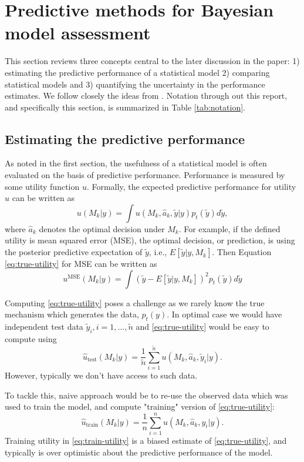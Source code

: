 \documentclass{article}
\begin{document}
\section{Predictive methods for Bayesian model assessment}
This section reviews three concepts central to the later discussion in the paper: 1) estimating the predictive performance of a statistical model 2) comparing statistical models and 3) quantifying the uncertainty in the performance estimates. We follow closely the ideas from \cite{vehtari_survey_2012}. Notation through out this report, and specifically this section, is summarized in Table  \ref{tab:notation}.

\subsection{Estimating the predictive performance}
As noted in the first section, the usefulness of a statistical model is often evaluated on the basis of predictive performance. Performance is measured by some utility function $u$. Formally, the expected predictive performance for utility $u$ can be written as 
\begin{equation}
u(M_k | y) = \int u(M_k, \hat{a}_k, \tilde{y} | y) p_t(\tilde{y}) d\tilde{y}, \label{eq:true-utility}
\end{equation}
where $\hat{a}_k$ denotes the optimal decision under $M_k$. For example, if the defined utility is mean squared error (MSE), the optimal decision, or prediction, is using the posterior predictive expectation of $\tilde{y}$, i.e., $E\left[ \tilde{y} | y, M_k \right]$. Then Equation \eqref{eq:true-utility} for MSE can be written as
$$
u^{\text{MSE}}(M_k | y) = \int \left( \tilde{y} - E\left[ \tilde{y} | y, M_k \right] \right)^2 p_t(\tilde{y}) d\tilde{y}
$$

Computing \eqref{eq:true-utility} poses a challenge as we rarely know the true mechanism which generates the data, $p_t(y)$. In optimal case we would have independent test data $\tilde{y}_i, i=1,...,\tilde{n}$ and \eqref{eq:true-utility} would be easy to compute using
\begin{equation}
    \hat{u}_{\text{test}}(M_k | y) = \frac{1}{\tilde{n}} \sum_{i=1}^{\tilde{n}} u(M_k, \hat{a}_k, \tilde{y}_i | y). \label{eq:test-utility}
\end{equation}
However, typically we don't have access to such data.

To tackle this, naive approach would be to re-use the observed data which was used to train the model, and compute "training" version of \eqref{eq:true-utility}:
\begin{equation}
    \hat{u}_{\text{train}}(M_k | y) = \frac{1}{n} \sum_{i=1}^n u(M_k, \hat{a}_k, y_i | y). \label{eq:train-utility}
\end{equation}
Training utility in \eqref{eq:train-utility} is a biased estimate of \eqref{eq:true-utility}, and typically is over optimistic about the predictive performance of the model.
\end{document}
